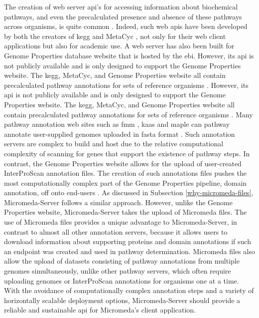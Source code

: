 The creation of web server \gls{api}'s for accessing information about 
biochemical pathways, and even the precalculated presence and absence of these 
pathways across organisms, is quite common 
\cite{wu2006kobas,moriya2010pathpred,pireddu2006path,vallenet2009microscope,aziz2008rast,takami2016automated,moriya2007kaas,chou2009fmm}. 
Indeed, such web \gls{api}s have been developed by both the creators of 
\gls{kegg} \cite{kawashima2003kegg} and MetaCyc \cite{karp2013data}, not only 
for their web client applications but also for academic use. A web server has 
also been built for Genome Properties database website 
\cite{richardson2018genome} that is hosted by the \gls{ebi}. However, its 
\gls{api} is not publicly available and is only designed to support the Genome 
Properties website. The \gls{kegg}, MetaCyc, and Genome Properties website all 
contain precalculated pathway annotations for sets of reference organisms 
\cite{kanehisa2000kegg,karp2002metacyc,karp2013data}. However, its \gls{api} is 
not publicly available and is only designed to support the Genome Properties 
website. The \gls{kegg}, MetaCyc, and Genome Properties website all contain 
precalculated pathway annotations for sets of reference organisms 
\cite{kanehisa2000kegg,karp2002metacyc,karp2013data}. Many pathway annotation 
web sites such as \gls{fmm} \cite{chou2009fmm}, \gls{kaas} \cite{moriya2007kaas} 
and \gls{maple} \cite{takami2016automated} can pathway annotate user-supplied 
genomes uploaded in \gls{fasta} format \cite{pearson19905}. Such annotation servers 
are complex to build and host due to the relative computational complexity of 
scanning for genes that support the existence of pathway steps. In contrast, the 
Genome Properties website allows for the upload of user-created InterProScan 
annotation files. The creation of such annotations files pushes the most 
computationally complex part of the Genome Properties pipeline, domain 
annotation, off onto end-users \cite{richardson2018genome}. As discussed in 
Subsection \ref{why-micromeda-files}, Micromeda-Server follows a similar 
approach. However, unlike the Genome Properties website, Micromeda-Server takes 
the upload of Micromeda files. The use of Micromeda files provides a unique 
advantage to Micromeda-Server, in contrast to almost all other annotation 
servers, because it allows users to download information about supporting 
proteins and domain annotations if such an endpoint was created and used in 
pathway determination. Micromeda files also allow the upload of datasets 
consisting of pathway annotations from multiple genomes simultaneously, unlike 
other pathway servers, which often require uploading genomes or InterProScan 
annotations for organisms one at a time. With the avoidance of computationally 
complex annotation steps and a variety of horizontally scalable deployment 
options, Micromeda-Server should provide a reliable and sustainable \gls{api} 
for Micromeda's client application.
